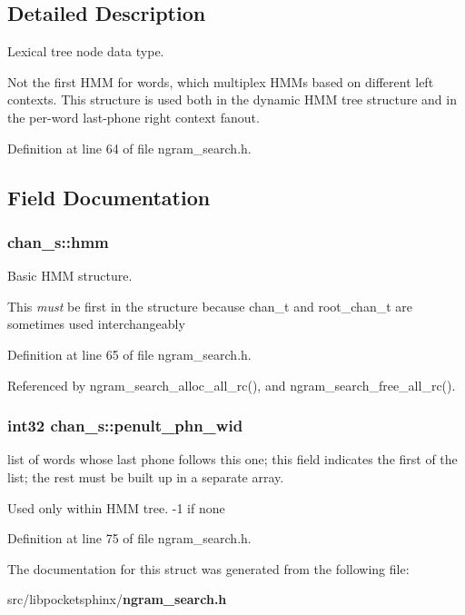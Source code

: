 \subsection{Detailed Description}
Lexical tree node data type. 

Not the first H\+M\+M for words, which multiplex H\+M\+Ms based on different left contexts. This structure is used both in the dynamic H\+M\+M tree structure and in the per-\/word last-\/phone right context fanout. 

Definition at line 64 of file ngram\+\_\+search.\+h.



\subsection{Field Documentation}
\subsubsection[{hmm}]{ chan\+\_\+s\+::hmm}\label{structchan__s_a742d6a125ac468b95a1ddd880a956e35}


Basic H\+M\+M structure. 

This {\itshape must} be first in the structure because chan\+\_\+t and root\+\_\+chan\+\_\+t are sometimes used interchangeably 

Definition at line 65 of file ngram\+\_\+search.\+h.



Referenced by ngram\+\_\+search\+\_\+alloc\+\_\+all\+\_\+rc(), and ngram\+\_\+search\+\_\+free\+\_\+all\+\_\+rc().

\subsubsection[{penult\+\_\+phn\+\_\+wid}]{\setlength{\rightskip}{0pt plus 5cm}int32 chan\+\_\+s\+::penult\+\_\+phn\+\_\+wid}\label{structchan__s_a136796f6a13c0d6989120f9aa25b85f1}


list of words whose last phone follows this one; this field indicates the first of the list; the rest must be built up in a separate array. 

Used only within H\+M\+M tree. -\/1 if none 

Definition at line 75 of file ngram\+\_\+search.\+h.



The documentation for this struct was generated from the following file\+:\begin{DoxyCompactItemize}
\item 
src/libpocketsphinx/{\bf ngram\+\_\+search.\+h}\end{DoxyCompactItemize}
